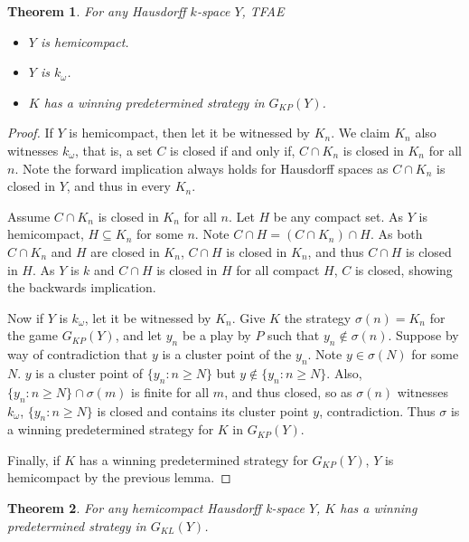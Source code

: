 \documentclass[11pt]{article}
\theoremstyle{plain}
\newtheorem{theorem}{Theorem}
\theoremstyle{definition}
\theoremstyle{remark}
\begin{document}
\begin{theorem}
For any Hausdorff $k$-space $Y$, TFAE
  \begin{itemize}
  \item $Y$ is hemicompact.
  \item $Y$ is $k_{\omega}$.
  \item $K$ has a winning predetermined strategy in $G_{KP}(Y)$.
  \end{itemize}
\end{theorem}

\begin{proof}
If $Y$ is hemicompact, then let it be witnessed by $K_n$. We claim $K_n$ also witnesses $k_{\omega}$, that is, a set $C$ is closed if and only if, $C\cap K_n$ is closed in $K_n$ for all $n$. Note the forward implication always holds for Hausdorff spaces as $C\cap K_n$ is closed in $Y$, and thus in every $K_n$.

Assume $C\cap K_n$ is closed in $K_n$ for all $n$. Let $H$ be any compact set. As $Y$ is hemicompact, $H\subseteq K_n$ for some $n$. Note $C\cap H = (C\cap K_n)\cap H$. As both $C \cap K_n$ and $H$ are closed in $K_n$, $C\cap H$ is closed in $K_n$, and thus $C\cap H$ is closed in $H$. As $Y$ is $k$ and $C\cap H$ is closed in $H$ for all compact $H$, $C$ is closed, showing the backwards implication.

Now if $Y$ is $k_\omega$, let it be witnessed by $K_n$. Give $K$ the strategy $\sigma(n)=K_n$ for the game $G_{KP}(Y)$, and let $y_n$ be a play by $P$ such that $y_n \not\in \sigma(n)$. Suppose by way of contradiction that $y$ is a cluster point of the $y_n$. Note $y\in \sigma(N)$ for some $N$. $y$ is a cluster point of $\{y_n : n\geq N\}$ but $y\not\in \{y_n : n \geq N\}$. Also, $\{y_n : n \geq N\} \cap \sigma(m)$ is finite for all $m$, and thus closed, so as $\sigma(n)$ witnesses $k_\omega$, $\{y_n : n\geq N\}$ is closed and contains its cluster point $y$, contradiction. Thus $\sigma$ is a winning predetermined strategy for $K$ in $G_{KP}(Y)$.

Finally, if $K$ has a winning predetermined strategy for $G_{KP}(Y)$, $Y$ is hemicompact by the previous lemma.
\end{proof}

\begin{theorem}
For any hemicompact Hausdorff k-space $Y$, $K$ has a winning predetermined strategy in $G_{KL}(Y)$.
\end{theorem}
\end{document}

